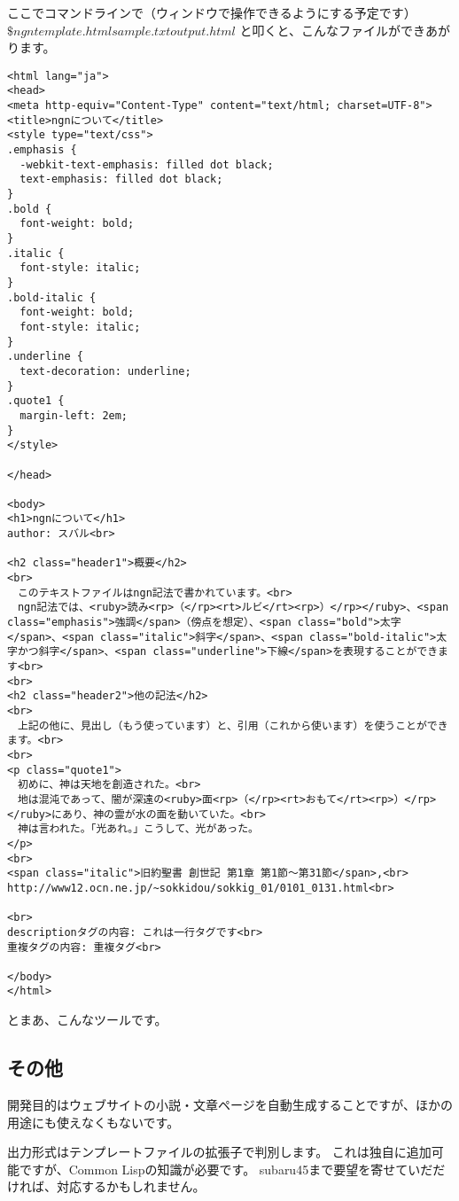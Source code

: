 \documentclass[a4j]{jsarticle}
\begin{document}
ここでコマンドラインで（ウィンドウで操作できるようにする予定です） $\$ngn template.html sample.txt output.html$ と叩くと、こんなファイルができあがります。

\begin{lstlisting}[caption=output.html]
<html lang="ja">
<head>
<meta http-equiv="Content-Type" content="text/html; charset=UTF-8">
<title>ngnについて</title>
<style type="text/css">
.emphasis {
  -webkit-text-emphasis: filled dot black;
  text-emphasis: filled dot black;
}
.bold {
  font-weight: bold;
}
.italic {
  font-style: italic;
}
.bold-italic {
  font-weight: bold;
  font-style: italic;
}
.underline {
  text-decoration: underline;
}
.quote1 {
  margin-left: 2em;
}
</style>

</head>

<body>
<h1>ngnについて</h1>
author: スバル<br>

<h2 class="header1">概要</h2>
<br>
　このテキストファイルはngn記法で書かれています。<br>
　ngn記法では、<ruby>読み<rp>（</rp><rt>ルビ</rt><rp>）</rp></ruby>、<span class="emphasis">強調</span>（傍点を想定）、<span class="bold">太字</span>、<span class="italic">斜字</span>、<span class="bold-italic">太字かつ斜字</span>、<span class="underline">下線</span>を表現することができます<br>
<br>
<h2 class="header2">他の記法</h2>
<br>
　上記の他に、見出し（もう使っています）と、引用（これから使います）を使うことができます。<br>
<br>
<p class="quote1">
　初めに、神は天地を創造された。<br>
　地は混沌であって、闇が深遠の<ruby>面<rp>（</rp><rt>おもて</rt><rp>）</rp></ruby>にあり、神の霊が水の面を動いていた。<br>
　神は言われた。「光あれ。」こうして、光があった。
</p>
<br>
<span class="italic">旧約聖書 創世記 第1章 第1節〜第31節</span>,<br>
http://www12.ocn.ne.jp/~sokkidou/sokkig_01/0101_0131.html<br>

<br>
descriptionタグの内容: これは一行タグです<br>
重複タグの内容: 重複タグ<br>

</body>
</html>
\end{lstlisting}

とまあ、こんなツールです。


\subsection{その他}

開発目的はウェブサイトの小説・文章ページを自動生成することですが、ほかの用途にも使えなくもないです。

出力形式はテンプレートファイルの拡張子で判別します。
これは独自に追加可能ですが、Common Lispの知識が必要です。
subaru45まで要望を寄せていだだければ、対応するかもしれません。
\end{document}
